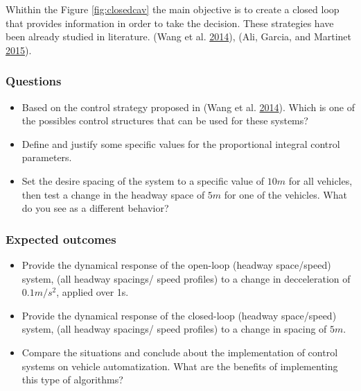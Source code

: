 \documentclass[]{book}
\providecommand{\tightlist}{%
  \setlength{\itemsep}{0pt}\setlength{\parskip}{0pt}}
\theoremstyle{definition}
\theoremstyle{definition}
\theoremstyle{definition}
\theoremstyle{remark}
\begin{document}
Whithin the Figure \ref{fig:closedcav} the main objective is to create a
closed loop that provides information in order to take the decision.
These strategies have been already studied in literature. (Wang et al.
\protect\hyperlink{ref-Meng2014b:TR-C}{2014}), (Ali, Garcia, and
Martinet \protect\hyperlink{ref-Ali2015:ITSM}{2015}).

\hypertarget{questions-6}{%
\subsubsection*{Questions}\label{questions-6}}

\begin{itemize}
\tightlist
\item
  Based on the control strategy proposed in (Wang et al.
  \protect\hyperlink{ref-Meng2014b:TR-C}{2014}). Which is one of the
  possibles control structures that can be used for these systems?
\item
  Define and justify some specific values for the proportional integral
  control parameters.
\item
  Set the desire spacing of the system to a specific value of \(10m\)
  for all vehicles, then test a change in the headway space of \(5m\)
  for one of the vehicles. What do you see as a different behavior?
\end{itemize}

\hypertarget{expected-outcomes-6}{%
\subsubsection*{Expected outcomes}\label{expected-outcomes-6}}

\begin{itemize}
\tightlist
\item
  Provide the dynamical response of the open-loop (headway space/speed)
  system, (all headway spacings/ speed profiles) to a change in
  decceleration of \(0.1m/s^2\), applied over 1s.\\
\item
  Provide the dynamical response of the closed-loop (headway
  space/speed) system, (all headway spacings/ speed profiles) to a
  change in spacing of \(5m\).
\item
  Compare the situations and conclude about the implementation of
  control systems on vehicle automatization. What are the benefits of
  implementing this type of algorithms?
\end{itemize}
\end{document}
